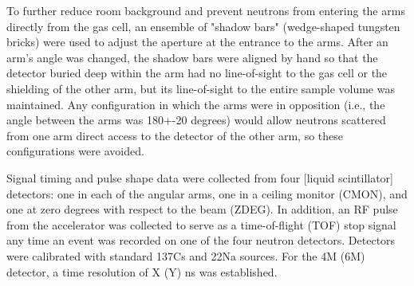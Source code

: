     To further reduce room background and prevent neutrons from entering the arms directly
    from the gas cell, an ensemble of "shadow bars" (wedge-shaped tungsten bricks)
    were used to adjust the aperture at the entrance to the arms. After an arm's
    angle was changed, the shadow bars were aligned by hand so that the
    detector buried deep within the arm had no line-of-sight to the gas cell or the
    shielding of the other arm, but its line-of-sight to the entire sample volume was
    maintained. Any configuration in which the arms were in opposition (i.e., the
    angle between the arms was 180+-20 degrees) would allow neutrons scattered
    from one arm direct access to the detector of the other arm, so these
    configurations were avoided.

    Signal timing and pulse shape data were collected from four [liquid scintillator]
    detectors: one in each of the angular arms, one in a ceiling monitor
    (CMON), and one at zero degrees with respect to the beam (ZDEG). In addition,
    an RF pulse from the accelerator was collected to serve as a time-of-flight
    (TOF) stop signal any time an event was recorded on one of the four neutron
    detectors. Detectors were calibrated with standard 137Cs and 22Na sources. For
    the 4M (6M) detector, a time resolution of X (Y) ns was established.
